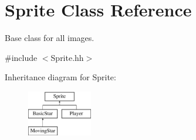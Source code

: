 \hypertarget{classSprite}{\section{Sprite Class Reference}
\label{classSprite}
}


Base class for all images.  




{\ttfamily \#include $<$Sprite.\-hh$>$}

Inheritance diagram for Sprite\-:\begin{figure}[H]
\begin{center}
\leavevmode
\includegraphics[height=2.000000cm]{classSprite}
\end{center}
\end{figure}
